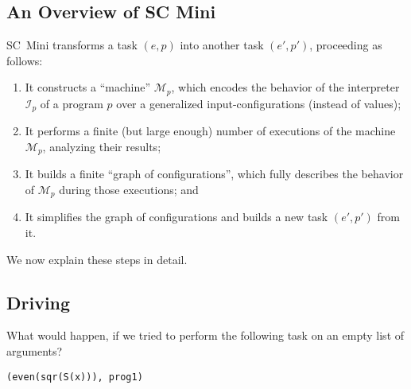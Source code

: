\subsection{An Overview of SC Mini}



SC~Mini transforms a task $(e, p)$ into another task $(e', p')$, proceeding as follows:
\begin{enumerate}
  \item It constructs a ``machine'' $\mathcal{M}_p$, which encodes the behavior of the 
  interpreter $\mathcal{I}_p$ of a program $p$ over a generalized input-configurations (instead of values);
  \item It performs a finite (but large enough) number of executions of the machine
  $\mathcal{M}_p$, analyzing their results;
  \item It builds a finite ``graph of configurations'', which fully describes the behavior of
  $\mathcal{M}_p$ during those executions; and
  \item It simplifies the graph of configurations and builds a new task $(e', p')$ from it.
\end{enumerate}

We now explain these steps in detail.

\subsection{Driving}
\label{sec:driving}
What would happen, if we tried to perform the following task on an empty list of arguments?
\begin{lstlisting}[language=sll]
(even(sqr(S(x))), prog1)
\end{lstlisting}

